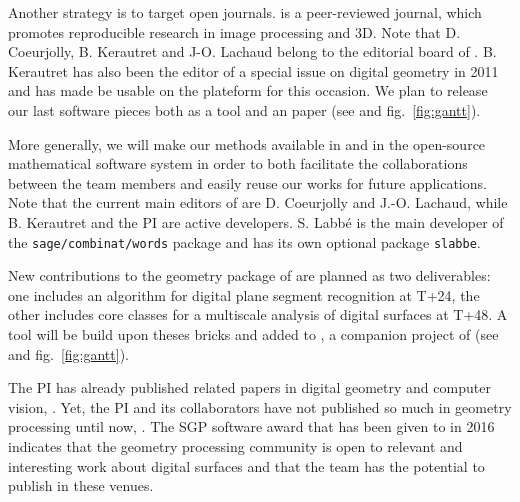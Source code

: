 Another strategy is to target open journals. {\IPOL} is a peer-reviewed journal, which promotes
reproducible research in image processing and 3D. Note that D. Coeurjolly, B. Kerautret and J-O. Lachaud
belong to the editorial board of {\IPOL}. B. Kerautret has also been the editor of a special issue on
digital geometry in 2011 and has made {\DGtal} be usable on the {\IPOL} plateform for this occasion. 
We plan to release our last software pieces both as a {\DGtal} tool and an {\IPOL} paper
(see  and fig.~\ref{fig:gantt}).

More generally, we will make our methods available in {\DGtal} 
and in the open-source mathematical software system {\sage}
in order to both facilitate the collaborations between the team members
and easily reuse our works for future applications.
Note that the current main editors of {\DGtal} are {D. Coeurjolly} and
{J.-O. Lachaud}, while {B. Kerautret} and the PI are active developers.
S. Labb\'{e} is the main developer of the \texttt{sage/combinat/words} package
and has its own optional package \texttt{slabbe}.

New contributions to the geometry package of
{\DGtal} are planned as two deliverables: one includes an algorithm for
digital plane segment recognition at T+24, the other includes core classes
for a multiscale analysis of digital surfaces at T+48. A tool will be build
upon theses bricks and added to {\DGtalTools}, a companion project of
{\DGtal} (see  and fig.~\ref{fig:gantt}).  


The PI has already published related papers in digital geometry and computer vision,
\eg \cite{LPRTCS2016,LPRDGCI2016,LPRJMIV2017}. 
Yet, the PI and its collaborators have not published so much in geometry processing until now,
\eg \cite{Coeurjolly2017}.
The SGP software award that has been given to {\DGtal} in 2016 indicates that the
geometry processing community is open to relevant and interesting work about digital surfaces
and that the team has the potential to publish in these venues.


